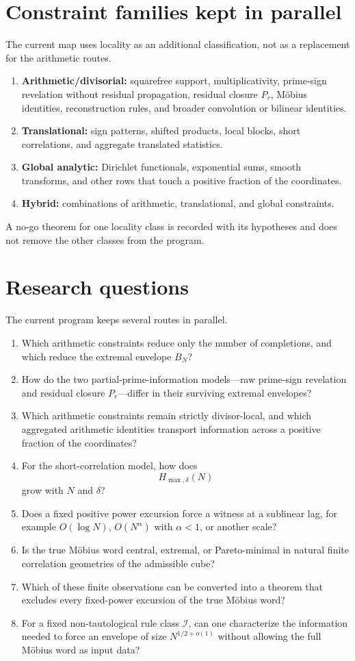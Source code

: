 \documentclass[11pt]{article}
\begin{document}
\section{Constraint families kept in parallel}
The current map uses locality as an additional classification, not as a replacement for the arithmetic routes.
\begin{enumerate}
\item \textbf{Arithmetic/divisorial:} squarefree support, multiplicativity, prime-sign revelation without residual propagation, residual closure $P_r$, Möbius identities, reconstruction rules, and broader convolution or bilinear identities.
\item \textbf{Translational:} sign patterns, shifted products, local blocks, short correlations, and aggregate translated statistics.
\item \textbf{Global analytic:} Dirichlet functionals, exponential sums, smooth transforms, and other rows that touch a positive fraction of the coordinates.
\item \textbf{Hybrid:} combinations of arithmetic, translational, and global constraints.
\end{enumerate}
A no-go theorem for one locality class is recorded with its hypotheses and does not remove the other classes from the program.

\section{Research questions}
The current program keeps several routes in parallel.
\begin{enumerate}
\item Which arithmetic constraints reduce only the number of completions, and which reduce the extremal envelope $B_N$?
\item How do the two partial-prime-information models---raw prime-sign revelation and residual closure $P_r$---differ in their surviving extremal envelopes?
\item Which arithmetic constraints remain strictly divisor-local, and which aggregated arithmetic identities transport information across a positive fraction of the coordinates?
\item For the short-correlation model, how does
\[
 H_{\max,\delta}(N)
\]
grow with $N$ and $\delta$?
\item Does a fixed positive power excursion force a witness at a sublinear lag, for example $O(\log N)$, $O(N^\alpha)$ with $\alpha<1$, or another scale?
\item Is the true Möbius word central, extremal, or Pareto-minimal in natural finite correlation geometries of the admissible cube?
\item Which of these finite observations can be converted into a theorem that excludes every fixed-power excursion of the true Möbius word?
\item For a fixed non-tautological rule class $\mathcal I$, can one characterize the information needed to force an envelope of size $N^{1/2+o(1)}$ without allowing the full Möbius word as input data?
\end{enumerate}
\end{document}
